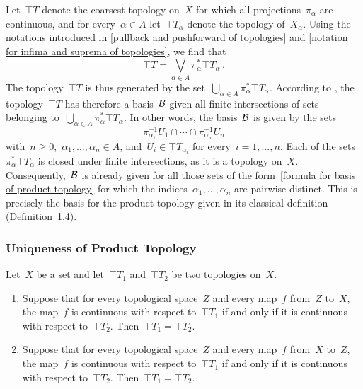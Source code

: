Let~$\top{T}$ denote the coarsest topology on~$X$ for which all projections~$π_α$ are continuous, and for every~$α ∈ A$ let~$\top{T}_α$ denote the topology of~$X_α$.
Using the notations introduced in \cref{pullback and pushforward of topologies} and \cref{notation for infima and suprema of topologies}, we find that
\[
	\top{T} = ⋁_{α ∈ A} π_α^* \top{T}_α \,.
\]
The topology~$\top{T}$ is thus generated by the set~$⋃_{α ∈ A} π_α^* \top{T}_α$.
According to , the topology~$\top{T}$ has therefore a basis~$\mathcal{B}$ given all finite intersections of sets belonging to~$⋃_{α ∈ A} π_α^* \top{T}_α$.
In other words, the basis~$\mathcal{B}$ is given by the sets
\begin{equation}
	\label{formula for basis of product topology}
	π_{α_1}^{-1} U_1 ∩ \dotsb ∩ π_{α_n}^{-1} U_n
\end{equation}
with~$n ≥ 0$,~$α_1, \dotsc, α_n ∈ A$, and~$U_i ∈ \top{T}_{α_i}$ for every~$i = 1, \dotsc, n$.
Each of the sets~$π_α^* \top{T}_α$ is closed under finite intersections, as it is a topology on~$X$.
Consequently,~$\mathcal{B}$ is already given for all those sets of the form~\eqref{formula for basis of product topology} for which the indices~$α_1, \dotsc, α_n$ are pairwise distinct.
This is precisely the basis for the product topology given in its classical definition (Definition~1.4).



\subsubsection{Uniqueness of Product Topology}

\begin{proposition}
	\label{topology uniquely determined by maps}
	Let~$X$ be a set and let~$\top{T}_1$ and~$\top{T}_2$ be two topologies on~$X$.
	\begin{enumerate}

		\item
			Suppose that for every topological space~$Z$ and every map~$f$ from~$Z$ to~$X$, the map~$f$ is continuous with respect to~$\top{T}_1$ if and only if it is continuous with respect to~$\top{T}_2$.
			Then~$\top{T}_1 = \top{T}_2$.

		\item
			Suppose that for every topological space~$Z$ and every map~$f$ from~$X$ to~$Z$, the map~$f$ is continuous with respect to~$\top{T}_1$ if and only if it is continuous with respect to~$\top{T}_2$.
			Then~$\top{T}_1 = \top{T}_2$.

	\end{enumerate}
\end{proposition}


